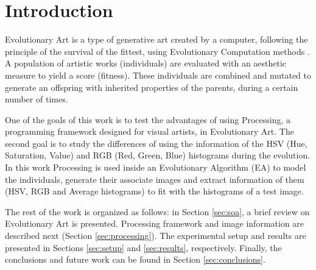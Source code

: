\documentclass[conference]{IEEEtran}
\begin{document}
\section{Introduction}\label{intro}
Evolutionary Art \cite{EART} is a type of generative art created by a
computer, following the principle of the survival of the fittest, %
using Evolutionary Computation methods \cite{INTROEIBEN}. A population
of artistic works (individuals) are evaluated with an aesthetic
measure to yield a score (fitness). These individuals are combined and
mutated to generate an offspring with inherited properties of the
parents, during a certain number of times. 

One of the goals of this work is to test the advantages of using
Processing, a programming framework designed for visual artists, in
Evolutionary Art. The second goal is to study the differences of using
the information of the HSV (Hue, Saturation, Value) and RGB (Red,
Green, Blue) histograms during the evolution. In this work Processing
is used inside an Evolutionary Algorithm (EA) to model the
individuals, generate their associate images and extract information
of them (HSV, RGB and Average histograms) to fit with the histograms
of a test image. 


The rest of the work is organized as follows: in Section \ref{sec:soa}, a brief review on Evolutionary Art is presented. Processing framework and image information are described next (Section \ref{sec:processing}). The experimental setup and results are presented in Sections \ref{sec:setup} and \ref{sec:results}, respectively. Finally, the conclusions and future work can be found in Section \ref{sec:conclusions}.
\end{document}
